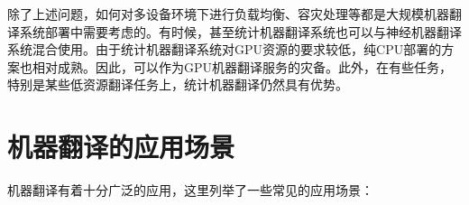 \parinterval 除了上述问题，如何对多设备环境下进行负载均衡、容灾处理等都是大规模机器翻译系统部署中需要考虑的。有时候，甚至统计机器翻译系统也可以与神经机器翻译系统混合使用。由于统计机器翻译系统对GPU资源的要求较低，纯CPU部署的方案也相对成熟。因此，可以作为GPU机器翻译服务的灾备。此外，在有些任务，特别是某些低资源翻译任务上，统计机器翻译仍然具有优势。


\section{机器翻译的应用场景}

\parinterval 机器翻译有着十分广泛的应用，这里列举了一些常见的应用场景：
